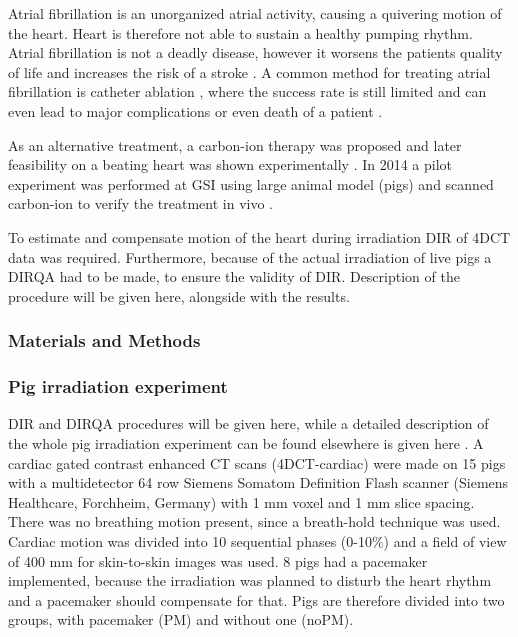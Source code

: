 \documentclass[type=dr, dr=rernat, accentcolor=tud7b,colorbacktitle, bigchapter, openright, twoside, 12pt ]{tudthesis}
\begin{document}
Atrial fibrillation is an unorganized atrial activity, causing a quivering motion of the heart. Heart is therefore not able to sustain a healthy pumping rhythm. Atrial fibrillation is not a
deadly disease, however it worsens the patients quality of life and increases the risk of a stroke \cite{Benjamin1998}. A common method for treating atrial fibrillation is catheter ablation \cite{January2014}, 
where the success rate is still limited and can even lead to major complications or even death of a patient \cite{Cappato2005,Cappato2010}.

As an alternative treatment, a carbon-ion therapy was proposed \cite{Bert2012} and later feasibility on a beating heart was shown experimentally \cite{Lehmann2015b}. In 2014 a pilot experiment was performed at GSI using large animal model (pigs) and
scanned carbon-ion to verify the treatment in vivo \cite{Lehmann2015}.

To estimate and compensate motion of the heart during irradiation DIR of 4DCT data was required. Furthermore, because of the actual irradiation of live pigs a DIRQA had to be made, to ensure the validity of DIR. Description of the procedure will be given here,
alongside with the results.


\subsubsection{Materials and Methods}


\subsubsection{Pig irradiation experiment}

DIR and DIRQA procedures will be given here, while a detailed description of the whole pig irradiation experiment can be found elsewhere is given here \cite{Lehmann2015}. A cardiac gated contrast enhanced CT scans (4DCT-cardiac) were made on 15 pigs with a multidetector 64 row Siemens Somatom Definition Flash scanner 
(Siemens Healthcare, Forchheim, Germany) with 1 mm voxel and 1 mm slice spacing. There was no breathing motion present, since a breath-hold technique was used. Cardiac motion was divided into 10 sequential phases (0-10\%) and a field of view of 400 mm for skin-to-skin images was used.
8 pigs had a pacemaker implemented, because the irradiation was planned to disturb the heart rhythm and a pacemaker should compensate for that. Pigs are therefore divided into two groups, with pacemaker (PM) and without one (noPM).
\end{document}
